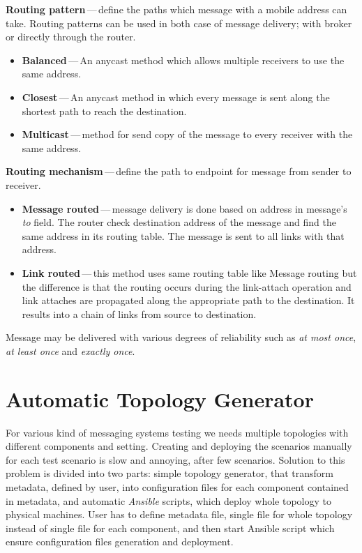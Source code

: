 \begin{description}
	\setlength\itemsep{0em}
	\item \textbf{Routing pattern}\,---\,define the paths which message with a mobile address can take. Routing patterns can be used in both case of message delivery; with broker or directly through the router.
	\begin{itemize}
		\setlength\itemsep{0em}
		\item \textbf{Balanced}\,---\,An anycast\footnotemark{} method which allows multiple receivers to use the same address.
		\item \textbf{Closest}\,---\,An anycast method in which every message is sent along the shortest path to reach the destination.
		\item \textbf{Multicast}\,---\,method for send copy of the message to every receiver with the same address.
	\end{itemize}
	\item \textbf{Routing mechanism}\,---\,define the path to endpoint for message from sender to receiver.
	\begin{itemize}
		\setlength\itemsep{0em}
		\item \textbf{Message routed}\,---\,message delivery is done based on address in message's \emph{to} field. The router check destination address of the message and find the same address in its routing table. The message is sent to all links with that address.
		\item \textbf{Link routed}\,---\,this method uses same routing table like Message routing but the difference is that the routing occurs during the link-attach operation and link attaches are propagated along the appropriate path to the destination. It results into a chain of links from source to destination.
	\end{itemize}
\end{description}
Message may be delivered with various degrees of reliability such as \emph{at most once}, \emph{at least once} and \emph{exactly once}.


\section{Automatic Topology Generator}
For various kind of messaging systems testing we needs multiple topologies with different components and setting. Creating and deploying the scenarios manually for each test scenario is slow and annoying, after few scenarios. Solution to this problem is divided into two parts: simple topology generator, that transform metadata, defined by user, into configuration files for each component contained in metadata, and automatic \emph{Ansible} scripts, which deploy whole topology to physical machines. User has to define metadata file, single file for whole topology instead of single file for each component, and then start Ansible script which ensure configuration files generation and deployment.


